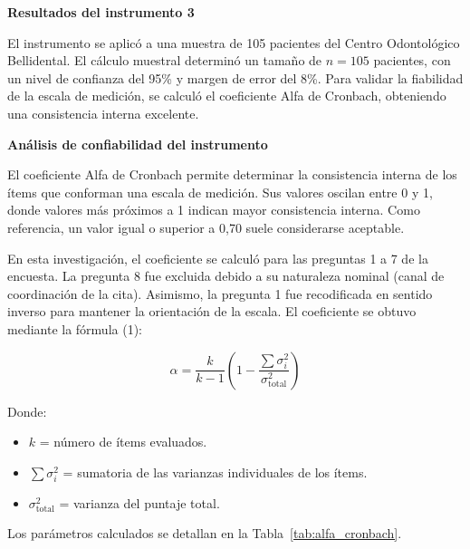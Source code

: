 
\textbf{Resultados del instrumento 3}

El instrumento se aplicó a una muestra de 105 pacientes del Centro Odontológico
Bellidental. El cálculo muestral determinó un tamaño de $n = 105$ pacientes, con un nivel de confianza del 95\% y margen de error del 8\%. Para validar la fiabilidad de la escala de medición, se calculó el coeficiente Alfa de Cronbach, obteniendo una consistencia interna excelente.


\textbf{Análisis de confiabilidad del instrumento}

El coeficiente Alfa de Cronbach permite determinar la consistencia interna de los ítems que conforman una escala de medición. Sus valores oscilan entre 0 y 1, donde valores más próximos a 1 indican mayor consistencia interna. Como referencia, un valor igual o superior a 0,70 suele considerarse aceptable.

En esta investigación, el coeficiente se calculó para las preguntas 1 a 7 de la encuesta. La pregunta 8 fue excluida debido a su naturaleza nominal (canal de coordinación de la cita). Asimismo, la pregunta 1 fue recodificada en sentido inverso para mantener la orientación de la escala. El coeficiente se obtuvo mediante la fórmula (1):

\begin{equation}
\alpha = \frac{k}{k - 1} \left( 1 - \frac{\sum \sigma_i^2}{\sigma_{\text{total}}^2} \right)
\end{equation}

Donde:
\begin{itemize}[nosep]
    \item $k$ = número de ítems evaluados.
    \item $\sum \sigma_i^2$ = sumatoria de las varianzas individuales de los ítems.
    \item $\sigma_{\text{total}}^2$ = varianza del puntaje total.
\end{itemize}

Los parámetros calculados se detallan en la Tabla~\ref{tab:alfa_cronbach}.

